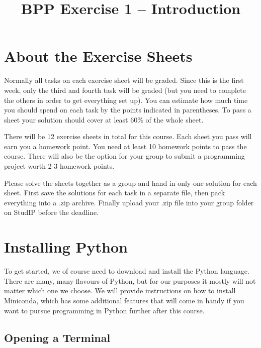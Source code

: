 

\makeatletter
{}
\tw@make@key@macro*{\OS}
\makeatother

\title{BPP Exercise 1 -- Introduction}




\section*{About the Exercise Sheets}

Normally all tasks on each exercise sheet will be graded. Since this is the first week, only the third and fourth task will be graded (but you need to complete the others in order to get everything set up). You can estimate how much time you should spend on each task by the points indicated in parentheses. To pass a sheet your solution should cover at least 60\% of the whole sheet.

\vspace{1em}

\noindent There will be 12 exercise sheets in total for this course. Each sheet you pass will earn you a homework point. You need at least 10 homework points to pass the course. There will also be the option for your group to submit a programming project worth 2-3 homework points.

\vspace{1em}

\noindent Please solve the sheets together as a group and hand in only one solution for each sheet. First save the solutions for each task in a separate file, then pack everything into a .zip archive. Finally upload your .zip file into your group folder on StudIP before the deadline.


\section{Installing Python}

To get started, we of course need to download and install the Python language. There are many, many flavours of Python, but for our purposes it mostly will not matter which one we choose. We will provide instructions on how to install Miniconda, which has some additional features that will come in handy if you want to pursue programming in Python further after this course.

\subsection{Opening a Terminal}

